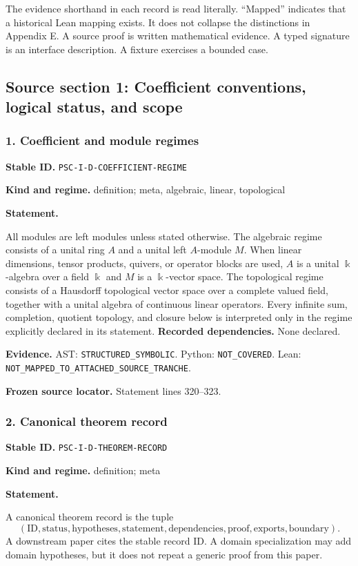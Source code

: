 \documentclass[a4paper,11pt]{article}
\newcommand{\bbk}{\Bbbk}\newcommand{\A}{\mathcal A}\newcommand{\B}{\mathcal B}\newcommand{\Ccal}{\mathcal C}\newcommand{\Pcal}{\mathcal P}\newcommand{\Qcal}{\mathcal Q}\newcommand{\Rcal}{\mathcal R}\newcommand{\Scal}{\mathcal S}
\newcommand{\field}[2]{\noindent\textbf{#1.} #2\par}
\begin{document}
The evidence shorthand in each record is read literally. ``Mapped'' indicates that a historical Lean mapping exists. It does not collapse the distinctions in Appendix E. A source proof is written mathematical evidence. A typed signature is an interface description. A fixture exercises a bounded case.

\clearpage\subsection{Source section 1: Coefficient conventions, logical status, and scope}
\subsubsection*{1. Coefficient and module regimes}
\label{rec:PSC-I-D-COEFFICIENT-REGIME}
\field{Stable ID}{\nolinkurl{PSC-I-D-COEFFICIENT-REGIME}}
\field{Kind and regime}{definition; meta, algebraic, linear, topological}
\textbf{Statement.}\par
All modules are left modules unless stated otherwise.  The algebraic regime consists of a unital ring $A$ and a unital left $A$-module $M$.  When linear dimensions, tensor products, quivers, or operator blocks are used, $A$ is a unital $\bbk$-algebra over a field $\bbk$ and $M$ is a $\bbk$-vector space.  The topological regime consists of a Hausdorff topological vector space over a complete valued field, together with a unital algebra of continuous linear operators.  Every infinite sum, completion, quotient topology, and closure below is interpreted only in the regime explicitly declared in its statement.
\field{Recorded dependencies}{None declared.}
\field{Evidence}{AST: \nolinkurl{STRUCTURED_SYMBOLIC}. Python: \nolinkurl{NOT_COVERED}. Lean: \nolinkurl{NOT_MAPPED_TO_ATTACHED_SOURCE_TRANCHE}.}
\field{Frozen source locator}{Statement lines 320--323.}
\subsubsection*{2. Canonical theorem record}
\label{rec:PSC-I-D-THEOREM-RECORD}
\field{Stable ID}{\nolinkurl{PSC-I-D-THEOREM-RECORD}}
\field{Kind and regime}{definition; meta}
\textbf{Statement.}\par
A canonical theorem record is the tuple
\[
(\mathrm{ID},\mathrm{status},\mathrm{hypotheses},\mathrm{statement},
\mathrm{dependencies},\mathrm{proof},\mathrm{exports},\mathrm{boundary}).
\]
A downstream paper cites the stable record ID.  A domain specialization may add domain hypotheses, but it does not repeat a generic proof from this paper.
\end{document}
